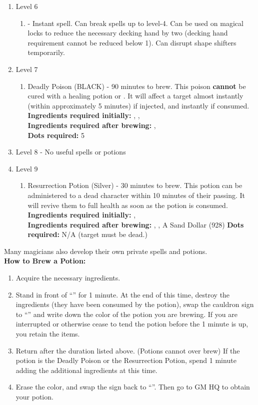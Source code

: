 \documentclass[green]{NeptuneBall}
\begin{document}
\begin{enumerate}
   \item Level 6
    \begin{enumerate}
      \item \aGreaterDispel{} - Instant spell. Can break spells up to level-4. Can be used on magical locks to reduce the necessary decking hand by two (decking hand requirement cannot be reduced below 1). Can disrupt shape shifters temporarily.
    \end{enumerate}
   \item Level 7
    \begin{enumerate}
      \item Deadly Poison (BLACK) - 90 minutes to brew. This poison {\bf cannot} be cured with a healing potion or \aFirstAid{}. It will affect a target almost instantly (within approximately 5 minutes) if injected, and instantly if consumed.\\
      {\bf Ingredients required initially:} \iIceFish{}, \iElectricEel{}, \iSwordfish{}\\
      {\bf Ingredients required after brewing:} \iSnails{}, \iDeepClam{}\\
		  {\bf Dots required:} 5
    \end{enumerate}
   \item Level 8 - No useful spells or potions
   \item Level 9
   	\begin{enumerate}
   	 \item Resurrection Potion (Silver) - 30 minutes to brew. This potion can be administered to a dead character within 10 minutes of their passing. It will revive them to full health as soon as the potion is consumed.\\
   	 {\bf Ingredients required initially:} \iSnails{}, \iPearl{}\\
   	 {\bf Ingredients required after brewing:} \iDrug{}, \iAnglerFish{}, A Sand Dollar (928)
   	 {\bf Dots required:} N/A (target must be dead.)
   	\end{enumerate}
\end{enumerate}
Many magicians also develop their own private spells and potions. \\

{\bf How to Brew a Potion:}
\begin{enumerate}
  \item Acquire the necessary ingredients.
  \item Stand in front of ``\sEmptyCauldron{}'' for 1 minute. At the end of this time, destroy the ingredients (they have been consumed by the potion), swap the cauldron sign to ``\sFullCauldron{}'' and write down the color of the potion you are brewing. If you are interrupted or otherwise cease to tend the potion before the 1 minute is up, you retain the items.
  \item Return after the duration listed above. (Potions cannot over brew) If the potion is the Deadly Poison or the Resurrection Potion, spend 1 minute adding the additional ingredients at this time.
  \item Erase the color, and swap the sign back to ``\sEmptyCauldron{}''. Then go to GM HQ to obtain your potion.
\end{enumerate}
\end{document}

